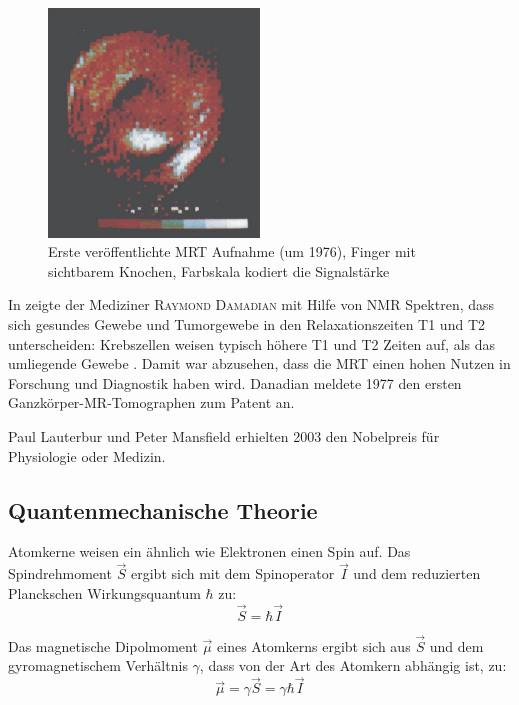 \begin{figure}[H]
	\centering
	\includegraphics[width=0.5\textwidth]{img/ext/mansfieldFinger.png}
	\caption[Erste MRT Aufnahme von Mansfield]{Erste veröffentlichte MRT Aufnahme (um 1976), Finger mit sichtbarem Knochen, Farbskala kodiert die Signalstärke \cite{Mansfield1977a}}
	\label{fig:mansfieldFinger}
\end{figure}

In \cite{Damadian1971} zeigte der Mediziner \textsc{Raymond Damadian} mit Hilfe von NMR Spektren, dass sich gesundes Gewebe und Tumorgewebe in den Relaxationszeiten T1 und T2 unterscheiden: Krebszellen weisen typisch höhere T1 und T2 Zeiten auf, als das umliegende Gewebe \cite{Damadian1971}. Damit war abzusehen, dass die MRT einen hohen Nutzen in Forschung und Diagnostik haben wird. Danadian meldete 1977 den ersten Ganzkörper-MR-Tomographen zum Patent an.

Paul Lauterbur und Peter Mansfield erhielten 2003 den Nobelpreis für Physiologie oder Medizin.


\subsection{Quantenmechanische Theorie}
Atomkerne weisen ein ähnlich wie Elektronen einen Spin auf. Das Spindrehmoment $\vec{S}$ ergibt sich mit dem Spinoperator $\vec{I}$ und dem reduzierten Planckschen Wirkungsquantum $\hbar$ zu:
\begin{equation}
	\vec{S}=\hbar \vec{I}
\end{equation}

Das magnetische Dipolmoment $\vec{\mu}$ eines Atomkerns ergibt sich aus $\vec{S}$ und dem gyromagnetischem Verhältnis $\gamma$, dass von der Art des Atomkern abhängig ist, zu:
\begin{equation}
	\vec{\mu}=\gamma \vec{S} = \gamma \hbar \vec{I}
\end{equation}

